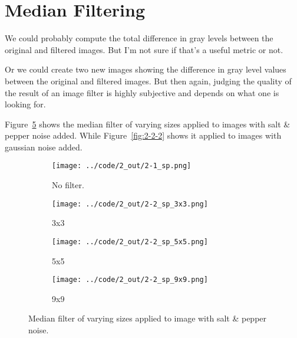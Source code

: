 \section{Median Filtering}
We could probably compute the total difference in gray levels between the original and filtered images.
But I'm not sure if that's a useful metric or not.

Or we could create two new images showing the difference in gray level values between the original and filtered images.
But then again, judging the quality of the result of an image filter is highly subjective and depends on what one is looking for.

Figure~\ref{fig:2-2-1} shows the median filter of varying sizes applied to images with salt \& pepper noise added.
While Figure~\ref{fig:2-2-2} shows it applied to images with gaussian noise added.

\begin{figure}[h]
    \centering

    \begin{subfigure}{0.3\textwidth}
        \texttt{[image: ../code/2\_out/2-1\_sp.png]}
        \caption{No filter.}
        \label{fig:2-2-1:1}
    \end{subfigure}
    \begin{subfigure}{0.3\textwidth}
        \texttt{[image: ../code/2\_out/2-2\_sp\_3x3.png]}
        \caption{3x3}
        \label{fig:2-2-1:2}
    \end{subfigure}

    \begin{subfigure}{0.3\textwidth}
        \texttt{[image: ../code/2\_out/2-2\_sp\_5x5.png]}
        \caption{5x5}
        \label{fig:2-2-1:3}
    \end{subfigure}
    \begin{subfigure}{0.3\textwidth}
        \texttt{[image: ../code/2\_out/2-2\_sp\_9x9.png]}
        \caption{9x9}
        \label{fig:2-2-1:4}
    \end{subfigure}

    \caption{Median filter of varying sizes applied to image with salt \& pepper noise.}
    \label{fig:2-2-1}
\end{figure}


